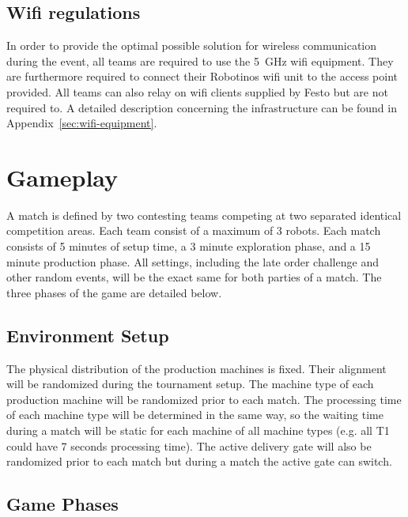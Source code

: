 \documentclass[12pt,twoside]{article}
\begin{document}
\subsection{Wifi regulations}
\label{sec:wifi-regulations}
In order to provide the optimal possible solution for wireless
communication during the event, all teams are required to use the
\SI{5}{\giga\hertz} wifi equipment. They are furthermore required to
connect their Robotinos wifi unit to the access point provided. All
teams can also relay on wifi clients supplied by Festo but are not
required to. A detailed description concerning the infrastructure can
be found in Appendix~\ref{sec:wifi-equipment}.



\section{Gameplay}
A match is defined by two contesting teams competing at two separated
identical competition areas. Each team consist of a maximum of 3
robots. Each match consists of 5 minutes of setup time,
a 3 minute exploration phase, and a 15 minute production phase. All
settings, including the late order challenge and other random events,
will be the exact same for both parties of a match. The three phases
of the game are detailed below.

\subsection{Environment Setup}
\label{sec:}

The physical distribution of the production machines is fixed. Their
alignment will be randomized during the tournament setup. The machine type of each production
machine will be randomized prior to each match. The processing time of
each machine type will be determined in the same way, so the waiting
time during a match will be static for each machine of all machine types
(e.g. all T1 could have 7 seconds processing time). The
active delivery gate will also be randomized prior to each match but
during a match the active gate can switch.

\subsection{Game Phases}
\label{sec:game-phases}
\end{document}
